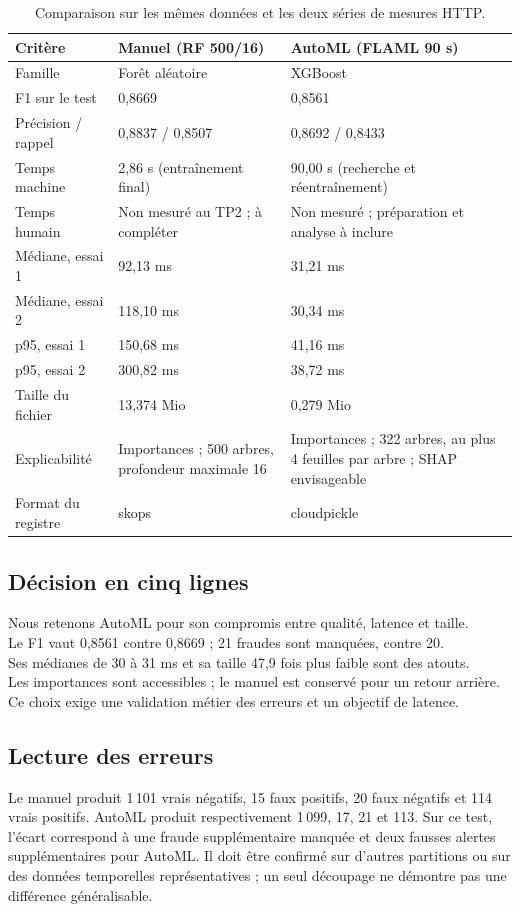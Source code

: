 \documentclass[11pt,a4paper]{article}
\begin{document}
\begin{table}[H]\centering
\small\renewcommand{\arraystretch}{1.32}
\begin{tabularx}{\linewidth}{p{4.0cm} X X}
\toprule
\textbf{Critère} & \textbf{Manuel (RF 500/16)} & \textbf{AutoML (FLAML 90 s)} \\
\midrule
Famille & Forêt aléatoire & XGBoost \\
F1 sur le test & 0,8669 & 0,8561 \\
Précision / rappel & 0,8837 / 0,8507 & 0,8692 / 0,8433 \\
Temps machine & 2,86 s (entraînement final) & 90,00 s (recherche et réentraînement) \\
Temps humain & Non mesuré au TP2 ; à compléter & Non mesuré ; préparation et analyse à inclure \\
Médiane, essai 1 & 92,13 ms & 31,21 ms \\
Médiane, essai 2 & 118,10 ms & 30,34 ms \\
p95, essai 1 & 150,68 ms & 41,16 ms \\
p95, essai 2 & 300,82 ms & 38,72 ms \\
Taille du fichier & 13,374 Mio & 0,279 Mio \\
Explicabilité & Importances ; 500 arbres, profondeur maximale 16 & Importances ; 322 arbres, au plus 4 feuilles par arbre ; SHAP envisageable \\
Format du registre & skops & cloudpickle \\
\bottomrule
\end{tabularx}
\caption{Comparaison sur les mêmes données et les deux séries de mesures HTTP.}
\end{table}

\subsection*{Décision en cinq lignes}
\noindent Nous retenons AutoML pour son compromis entre qualité, latence et taille.\\
Le F1 vaut 0,8561 contre 0,8669 ; 21 fraudes sont manquées, contre 20.\\
Ses médianes de 30 à 31 ms et sa taille 47,9 fois plus faible sont des atouts.\\
Les importances sont accessibles ; le manuel est conservé pour un retour arrière.\\
Ce choix exige une validation métier des erreurs et un objectif de latence.

\subsection*{Lecture des erreurs}
Le manuel produit 1\,101 vrais négatifs, 15 faux positifs, 20 faux négatifs et 114 vrais positifs. AutoML produit respectivement 1\,099, 17, 21 et 113. Sur ce test, l'écart correspond à une fraude supplémentaire manquée et deux fausses alertes supplémentaires pour AutoML. Il doit être confirmé sur d'autres partitions ou sur des données temporelles représentatives ; un seul découpage ne démontre pas une différence généralisable.
\end{document}
